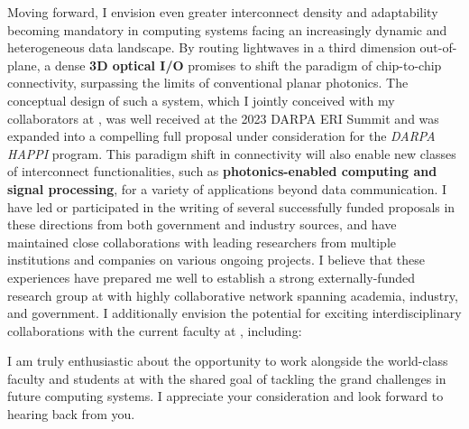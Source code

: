 Moving forward, I envision even greater interconnect density and adaptability becoming mandatory in computing systems facing an increasingly dynamic and heterogeneous data landscape. By routing lightwaves in a third dimension out-of-plane, a dense \textbf{3D optical I/O} promises to shift the paradigm of chip-to-chip connectivity, surpassing the limits of conventional planar photonics. The conceptual design of such a system, which I jointly conceived with my collaborators at \mySchoolShort{}, was well received at the 2023 DARPA ERI Summit and was expanded into a compelling full proposal under consideration for the \emph{DARPA HAPPI} program. This paradigm shift in connectivity will also enable new classes of interconnect functionalities, such as \textbf{photonics-enabled computing and signal processing}, for a variety of applications beyond data communication. I have led or participated in the writing of several successfully funded proposals in these directions from both government and industry sources, and have maintained close collaborations with leading researchers from multiple institutions and companies on various ongoing projects. I believe that these experiences have prepared me well to establish a strong externally-funded research group at \appSchoolDeptShort{} with highly collaborative network spanning academia, industry, and government. I additionally envision the potential for exciting interdisciplinary collaborations with the current faculty at \appSchoolShort{}, including:
\begin{enumerate*}[label=(\roman*)]
    \appCollab{}
\end{enumerate*}

I am truly enthusiastic about the opportunity to work alongside the world-class faculty and students at \appSchoolDeptShort{} with the shared goal of tackling the grand challenges in future computing systems. I appreciate your consideration and look forward to hearing back from you.